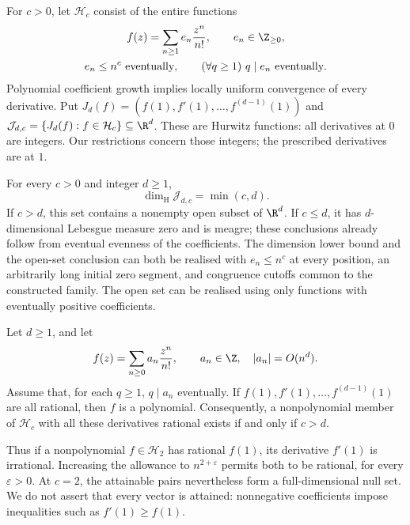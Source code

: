 \documentclass[11pt]{article}
\begin{document}
For $c>0$, let $\mathcal H_c$ consist of the entire functions
\[
 \begin{gathered}
 f(z)=\sum_{n\ge1}e_n\frac{z^n}{n!},\qquad e_n\in\Z_{\ge0},\\
 e_n\le n^c\ \hbox{eventually},\qquad
 (\forall q\ge1)\ q\mid e_n\ \hbox{eventually}.
 \end{gathered}
\]
Polynomial coefficient growth implies locally uniform convergence of every
derivative. Put $J_d(f)=(f(1),f'(1),\ldots,f^{(d-1)}(1))$ and
$\mathcal J_{d,c}=\{J_d(f):f\in\mathcal H_c\}\subseteq\R^d$.
These are Hurwitz functions: all derivatives at $0$ are integers. Our
restrictions concern those integers; the prescribed derivatives are at $1$.

\begin{theorem}
\label{capacity:thm:jets}
For every $c>0$ and integer $d\ge1$,
\[
 \dim_{\mathrm H}\mathcal J_{d,c}=\min(c,d).
\]
If $c>d$, this set contains a nonempty open subset of $\R^d$.
If $c\le d$, it has $d$-dimensional Lebesgue measure zero and is meagre;
these conclusions already follow from eventual evenness of the coefficients.
The dimension lower bound and the open-set conclusion can both be realised
with $e_n\le n^c$ at every position, an arbitrarily long initial zero segment,
and congruence cutoffs common to the constructed family. The open set can
be realised using only functions with eventually positive coefficients.
\end{theorem}

\begin{theorem}
\label{capacity:thm:rational-jets}
Let $d\ge1$, and let
\[
 f(z)=\sum_{n\ge0}a_n\frac{z^n}{n!},\qquad a_n\in\Z,\quad |a_n|=O(n^d).
\]
Assume that, for each $q\ge1$, $q\mid a_n$ eventually.
If $f(1),f'(1),\ldots,f^{(d-1)}(1)$ are all rational, then $f$ is a polynomial.
Consequently, a nonpolynomial member of $\mathcal H_c$ with all these
derivatives rational exists if and only if $c>d$.
\end{theorem}

Thus if a nonpolynomial $f\in\mathcal H_2$ has rational $f(1)$, its derivative
$f'(1)$ is irrational. Increasing the allowance to $n^{2+\varepsilon}$
permits both to be rational, for every $\varepsilon>0$. At $c=2$, the
attainable pairs nevertheless form a full-dimensional null set.
We do not assert that every vector is attained:
nonnegative coefficients impose inequalities such as $f'(1)\ge f(1)$.
\end{document}
